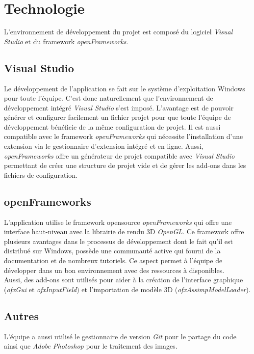 \section{Technologie}
\label{s:technologie}
L'environnement de développement du projet est composé du logiciel \textit{Visual Studio} et du framework \textit{openFrameworks}.
\subsection{Visual Studio}
Le développement de l'application se fait sur le système d'exploitation Windows pour toute l'équipe.
C'est donc naturellement que l'environnement de développement intégré \textit{Visual Studio} s'est imposé.
L'avantage est de pouvoir générer et configurer facilement un fichier projet pour que toute l'équipe de développement bénéficie de la même configuration de projet.
Il est aussi compatible avec le framework \textit{openFrameworks} qui nécessite l'installation d'une extension via le gestionnaire d'extension intégré et en ligne.
Aussi, \textit{openFrameworks} offre un générateur de projet compatible avec \textit{Visual Studio} permettant de créer une structure de projet vide et de gérer les add-ons dans les fichiers de configuration.

\subsection{openFrameworks}
L'application utilise le framework opensource \textit{openFrameworks} qui offre une interface haut-niveau avec la librairie de rendu 3D \textit{OpenGL}.
Ce framework offre plusieurs avantages dans le processus de développement dont le fait qu'il est distribué sur Windows, possède une communauté active qui fourni de la documentation et de nombreux tutoriels.
Ce aspect permet à l'équipe de développer dans un bon environnement avec des ressources à disponibles. \\
\newline
Aussi, des add-ons sont utilisés pour aider à la création de l'interface graphique (\textit{ofxGui} et \textit{ofxInputField}) et l'importation de modèle 3D (\textit{ofxAssimpModelLoader}).

\subsection{Autres}
L'équipe a aussi utilisé le gestionnaire de version \textit{Git} pour le partage du code ainsi que \textit{Adobe Photoshop} pour le traitement des images. 